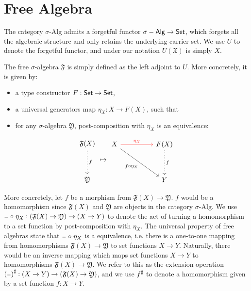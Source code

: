 \section{Free Algebra}\label{sec:universal-algebra:free-algebras}
The category $\sigma$-Alg admits a forgetful functor
$\sigma-\operatorname{\mathsf{Alg}} \to \mathsf{Set}$, which forgets all the algebraic structure
and only retains the underlying carrier set.
We use $U$ to denote the forgetful functor, and under our notation
$U(\mathfrak{X})$ is simply $X$.

The free $\sigma$-algebra $\mathfrak{F}$ is simply defined as the left adjoint to $U$.
More concretely, it is given by:
\begin{itemize}
    \item a type constructor $F : \mathsf{Set} \to \mathsf{Set}$,
    \item a universal generators map $\eta_X : X \to F(X)$, such that
    \item for any $\sigma$-algebra $\mathfrak{Y}$, post-composition with $\eta_X$ is an equivalence:
\end{itemize}
\[
\begin{tikzcd}[ampersand replacement=\&]
	\mathfrak{F}(X) \\
	\\
	\mathfrak{Y}
	\arrow["f", dotted, from=1-1, to=3-1]
\end{tikzcd}
\mapsto
\begin{tikzcd}[ampersand replacement=\&]
	X \&\& {F(X)} \\
	\\
	\&\& {Y}
	\arrow["\eta_X", color={rgb,255:red,255;green,54;blue,51}, from=1-1, to=1-3]
	\arrow["f \comp \eta_X"', from=1-1, to=3-3]
	\arrow["{f}", dotted, from=1-3, to=3-3]
\end{tikzcd}\]

More concretely, let $f$ be a morphism from $\mathfrak{F}(X) \to \mathfrak{Y}$.
$f$ would be a homomorphism since $\mathfrak{F}(X)$ and $\mathfrak{Y}$ are
objects in the category $\sigma$-Alg. 
We use
${\scriptstyle{-}} \mathrel{\circ} \eta_X : (\mathfrak{F}(X) \to \mathfrak{Y}) \to (X \to Y)$
to denote the act of turning a homomorphism to a set function by
post-composition with $\eta_X$.
The universal property of free algebras state that ${\scriptstyle{-}} \mathrel{\circ} \eta_X$
is a equivalence, i.e. there is a one-to-one mapping from
homomorphisms $\mathfrak{F}(X) \to \mathfrak{Y}$ to set functions $X \to Y$.
Naturally, there would be an inverse mapping which maps set functions $X \to Y$
to homomorphisms $\mathfrak{F}(X) \to \mathfrak{Y}$. We refer to this
as the extension operation ${({\scriptstyle{-}})}^{\sharp} : (X \to Y) \to (\mathfrak{F}(X) \to \mathfrak{Y})$,
and we use ${f}^{\sharp}$ to denote a homomorphism given by a set function $f : X \to Y$.

